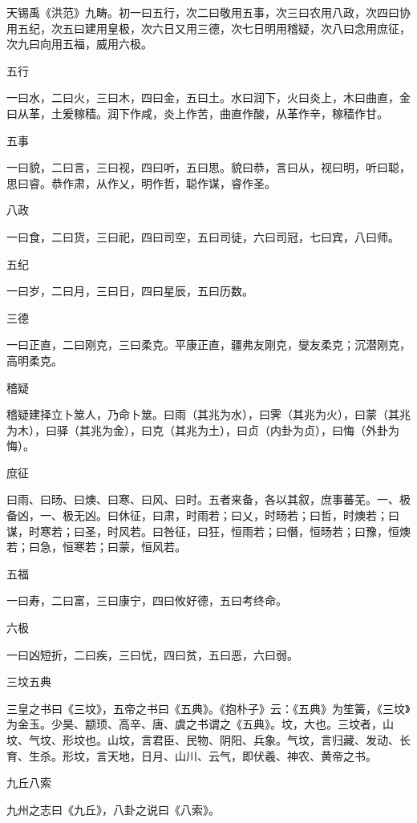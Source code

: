 \documentclass[a4paper,12pt,UTF8,twoside]{ctexbook}
\begin{document}
    天锡禹《洪范》九畴。初一曰五行，次二曰敬用五事，次三曰农用八政，次四曰协用五纪，次五曰建用皇极，次六日又用三德，次七日明用稽疑，次八曰念用庶征，次九曰向用五福，威用六极。
    
    五行
    
    一曰水，二曰火，三曰木，四曰金，五曰土。水曰润下，火曰炎上，木曰曲直，金曰从革，土爰稼穑。润下作咸，炎上作苦，曲直作酸，从革作辛，稼穑作甘。
    
    五事
    
    一曰貌，二曰言，三曰视，四曰听，五曰思。貌曰恭，言曰从，视曰明，听曰聪，思曰睿。恭作肃，从作乂，明作哲，聪作谋，睿作圣。
    
    八政
    
    一曰食，二曰货，三曰祀，四曰司空，五曰司徒，六曰司冠，七曰宾，八曰师。
    
    五纪
    
    一曰岁，二曰月，三曰日，四曰星辰，五曰历数。
    
    三德
    
    一曰正直，二曰刚克，三曰柔克。平康正直，疆弗友刚克，燮友柔克；沉潜刚克，高明柔克。
    
    稽疑
    
    稽疑建择立卜筮人，乃命卜筮。曰雨（其兆为水），曰霁（其兆为火），曰蒙（其兆为木），曰驿（其兆为金），曰克（其兆为土），曰贞（内卦为贞），曰悔（外卦为悔）。
    
    庶征
    
    曰雨、曰旸、曰燠、曰寒、曰风、曰时。五者来备，各以其叙，庶事蕃芜。一、极备凶，一、极无凶。曰休征，曰肃，时雨若；曰乂，时旸若；曰哲，时燠若；曰谋，时寒若；曰圣，时风若。曰咎征，曰狂，恒雨若；曰僭，恒旸若；曰豫，恒燠若；曰急，恒寒若；曰蒙，恒风若。
    
    五福
    
    一曰寿，二曰富，三曰康宁，四曰攸好德，五曰考终命。
    
    六极
    
    一曰凶短折，二曰疾，三曰忧，四曰贫，五曰恶，六曰弱。
    
    三坟五典
    
    三皇之书曰《三坟》，五帝之书曰《五典》。《抱朴子》云：《五典》为笙簧，《三坟》为金玉。少昊、颛顼、高辛、唐、虞之书谓之《五典》。坟，大也。三坟者，山坟、气坟、形坟也。山坟，言君臣、民物、阴阳、兵象。气坟，言归藏、发动、长育、生杀。形坟，言天地，日月、山川、云气，即伏羲、神农、黄帝之书。
    
    九丘八索
    
    九州之志曰《九丘》，八卦之说曰《八索》。
    
\end{document}
